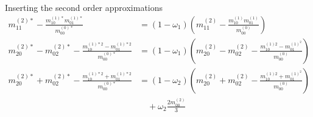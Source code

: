 Inserting the second order approximations
\begin{equation}
  \begin{aligned}
    m_{11}^{(2)*} - \frac{ m_{10}^{(1)*}m_{01}^{(1)*}}{m_{00}^{(0)*}} & = (1-\omega_1)\left(m_{11}^{(2)} - \frac{ m_{10}^{(1)}m_{01}^{(1)}}{m_{00}^{(0)}}\right) \\
    m_{20}^{(2)*}-m_{02}^{(2)*} - \frac{ m_{10}^{(1)*2} - m_{01}^{(1)*2}}{m_{00}^{(0)*}} & = (1-\omega_1) \left(m_{20}^{(2)}-m_{02}^{(2)} - \frac{ m_{10}^{(1)2} - m_{01}^{{(1)}^2}}{m_{00}^{(0)}}\right) \\
    m_{20}^{(2)*}+m_{02}^{(2)*} - \frac{ m_{10}^{(1)*2} + m_{01}^{(1)*2}}{m_{00}^{(0)*}} & = (1-\omega_2)
    \left(m_{20}^{(2)}+m_{02}^{(2)} - \frac{ m_{10}^{(1)2} + m_{01}^{{(1)}^2}}{m_{00}^{(0)}}\right)
    \\&\quad
    + \omega_2 \frac{2 m_{00}^{(2)}}{3} \\
  \end{aligned}
\end{equation}

